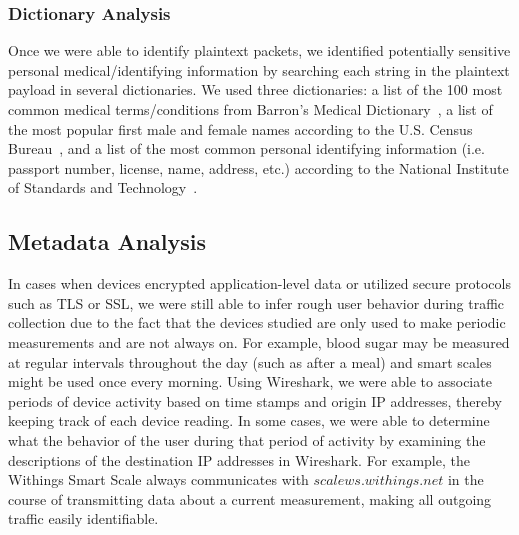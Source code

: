 \subsubsection{Dictionary Analysis}
Once we were able to identify plaintext packets, we identified potentially sensitive personal medical/identifying information by searching each string in the plaintext payload in several dictionaries. We used three dictionaries: a list of the 100 most common medical terms/conditions from Barron's Medical Dictionary~\cite{barrons}, a list of the most popular first male and female names according to the U.S. Census Bureau~\cite{names}, and a list of the most common personal identifying information (i.e. passport number, license, name, address, etc.) according to the National Institute of Standards and Technology~\cite{nist}. 

\subsection{Metadata Analysis}
In cases when devices encrypted application-level data or utilized secure protocols such as TLS or SSL, we were still able to infer rough user behavior during traffic collection due to the fact that the devices studied are only used to make periodic measurements and are not always on. For example, blood sugar may be measured at regular intervals throughout the day (such as after a meal) and smart scales might be used once every morning. Using Wireshark, we were able to associate periods of device activity based on time stamps and origin IP addresses, thereby keeping track of each device reading. In some cases, we were able to determine what the behavior of the user during that period of activity by examining the descriptions of the destination IP addresses in Wireshark. For example, the Withings Smart Scale always communicates with $scalews.withings.net$ in the course of transmitting data about a current measurement, making all outgoing traffic easily identifiable.


